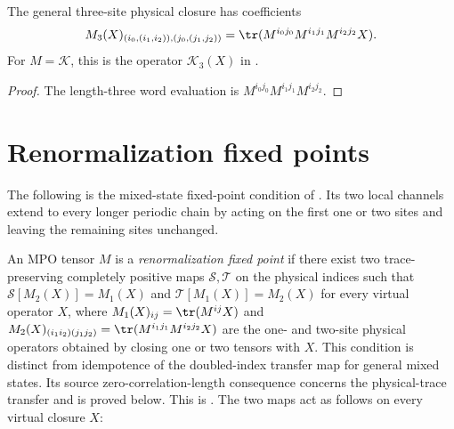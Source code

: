 \begin{lemma}
    \label{lem:phys_close_three}
    \leanok
    The general three-site physical closure has coefficients
    \[
        M_3(X)_{(i_0,(i_1,i_2)),(j_0,(j_1,j_2))}
        =\tr(M^{i_0j_0} M^{i_1j_1} M^{i_2j_2} X).
    \]
    For $M=\mathcal K$, this is the operator $\mathcal K_3(X)$ in
    \cite[Proposition~C.7, lines~1510--1516]{Cirac2016MPDO_arXiv}.
\end{lemma}
\begin{proof}
    \leanok
    The length-three word evaluation is
    $M^{i_0j_0}M^{i_1j_1}M^{i_2j_2}$.
\end{proof}

\section{Renormalization fixed points}

The following is the mixed-state fixed-point condition of
\cite[Definition~4.1]{Cirac2016MPDO_arXiv}.  Its two local channels extend to
every longer periodic chain by acting on the first one or two sites and leaving
the remaining sites unchanged.

\begin{definition}
    \label{def:is_rfp_via_ts}
    \leanok
    An MPO tensor $M$ is a \emph{renormalization fixed point} if there exist two
    trace-preserving completely positive maps $\mathcal{S}, \mathcal{T}$ on the
    physical indices such that $\mathcal{S}[M_2(X)] = M_1(X)$ and
    $\mathcal{T}[M_1(X)] = M_2(X)$ for every virtual operator $X$, where
    $M_1(X)_{ij} = \tr(M^{ij} X)$ and
    $M_2(X)_{(i_1 i_2)(j_1 j_2)} = \tr(M^{i_1 j_1} M^{i_2 j_2} X)$ are the one-
    and two-site physical operators obtained by closing one or two tensors with
    $X$. This condition is distinct from idempotence of the doubled-index
    transfer map for general mixed states. Its source zero-correlation-length
    consequence concerns the physical-trace transfer and is proved below.
    This is \cite[Definition~4.1, line~657]{Cirac2016MPDO_arXiv}.
    The two maps act as follows on every virtual closure $X$:
    \TNMPORenormalizationTS
\end{definition}

